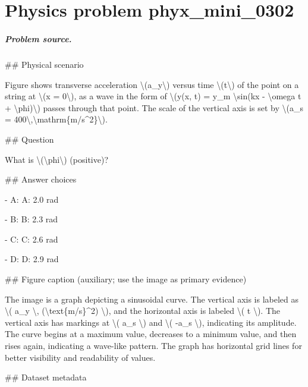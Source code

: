 
\chapter{Physics problem phyx\_mini\_0302}
\label{ch:PhyXMiniProblems_problem_phyx_mini_0302}

\paragraph{Problem source.}
\#\# Physical scenario

Figure shows transverse acceleration \textbackslash{}(a\_y\textbackslash{}) versus time \textbackslash{}(t\textbackslash{}) of the point on a string at \textbackslash{}(x = 0\textbackslash{}), as a wave in the form of \textbackslash{}(y(x, t) = y\_m \textbackslash{}sin(kx - \textbackslash{}omega t + \textbackslash{}phi)\textbackslash{}) passes through that point. The scale of the vertical axis is set by \textbackslash{}(a\_s = 400\textbackslash{},\textbackslash{}mathrm\{m/s\textasciicircum{}2\}\textbackslash{}).

\#\# Question

What is \textbackslash{}(\textbackslash{}phi\textbackslash{}) (positive)?

\#\# Answer choices

- A: A: 2.0 rad

- B: B: 2.3 rad

- C: C: 2.6 rad

- D: D: 2.9 rad

\#\# Figure caption (auxiliary; use the image as primary evidence)

The image is a graph depicting a sinusoidal curve. The vertical axis is labeled as \textbackslash{}( a\_y \textbackslash{}, (\textbackslash{}text\{m/s\}\textasciicircum{}2) \textbackslash{}), and the horizontal axis is labeled \textbackslash{}( t \textbackslash{}). The vertical axis has markings at \textbackslash{}( a\_s \textbackslash{}) and \textbackslash{}( -a\_s \textbackslash{}), indicating its amplitude. The curve begins at a maximum value, decreases to a minimum value, and then rises again, indicating a wave-like pattern. The graph has horizontal grid lines for better visibility and readability of values.

\#\# Dataset metadata

